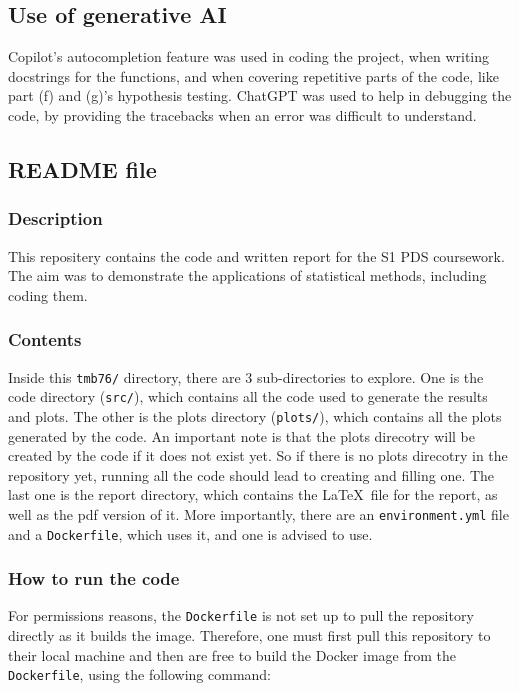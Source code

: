\documentclass[12pt]{report} %
\begin{document}
\subsection*{Use of generative AI}
Copilot's autocompletion feature was used in coding the project, when writing docstrings for the functions, and when covering repetitive parts of the code, like part (f) and (g)'s hypothesis testing.
ChatGPT was used to help in debugging the code, by providing the tracebacks when an error was difficult to understand.

\subsection*{README file}

\subsubsection*{Description} 
This repositery contains the code and written report for the S1 PDS coursework. The aim was to demonstrate the applications of statistical methods, including coding them.

\subsubsection*{Contents}  
Inside this \texttt{tmb76/} directory, there are 3 sub-directories to explore. One is the code directory (\texttt{src/}), which contains all the code used to generate the results and plots. The other is the plots directory (\texttt{plots/}), which contains all the plots generated by the code. An important note is that the plots direcotry will be created by the code if it does not exist yet. So if there is no plots direcotry in the repository yet, running all the code should lead to creating and filling one. The last one is the report directory, which contains the \LaTeX\ file for the report, as well as the pdf version of it. More importantly, there are an \texttt{environment.yml} file and a \texttt{Dockerfile}, which uses it, and one is advised to use.

\subsubsection*{How to run the code}
For permissions reasons, the \texttt{Dockerfile} is not set up to pull the repository directly as it builds the image. Therefore, one must first pull this repository to their local machine and then are free to build the Docker image from the \texttt{Dockerfile}, using the following command:
\end{document}
